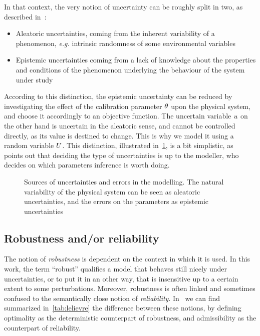 \documentclass[../../Main_ManuscritThese.tex]{subfiles}
\begin{document}
In that context, the very notion of uncertainty can be roughly split
in two, as described in~\cite{walker_defining_2003}:
\begin{itemize}
\item Aleatoric uncertainties, coming from the inherent variability of
  a phenomenon, \emph{e.g.} intrinsic randomness of some environmental
  variables
\item Epistemic uncertainties coming from a lack of knowledge about
  the properties and conditions of the phenomenon underlying the
  behaviour of the system under study
\end{itemize}
According to this distinction, the epistemic uncertainty can be
reduced by investigating the effect of the calibration parameter $\theta$
upon the physical system, and choose it accordingly to an objective
function.  The uncertain variable $u$ on the other hand is uncertain
in the aleatoric sense, and cannot be controlled directly, as its
value is destined to change. This is why we model it using a random
variable $U$. This distinction, illustrated
in~\cref{fig:sources_uncertainties}, is a bit simplistic,
as~\cite{kiureghian_aleatory_2009} points out that deciding the type
of uncertainties is up to the modeller, who decides on which
parameters inference is worth doing.

\begin{figure}[ht]
  \begin{center}
  \resizebox{\linewidth}{!}
  {
      
    }
    \end{center}
  \caption[Sources of uncertainties and errors in the modelling]{\label{fig:sources_uncertainties} Sources of uncertainties and errors in the modelling. The natural variability of the physical system can be seen as aleatoric uncertainties, and the errors on the parameters as epistemic uncertainties}
\end{figure}

\subsection{Robustness and/or reliability}
The notion of \emph{robustness} is dependent on the context in which
it is used. In this work, the term ``robust'' qualifies a model that
behaves still nicely under uncertainties, or to put it in an other
way, that is insensitive up to a certain extent to some perturbations.
Moreover, robustness is often linked and sometimes confused to the
semantically close notion of
\emph{reliability}. In~\cite{lelievre_consideration_2016} we can find
summarized in~\cref{tab:lelievre} the difference between these
notions, by defining optimality as the deterministic counterpart of
robustness, and admissibility as the counterpart of reliability.
\end{document}
